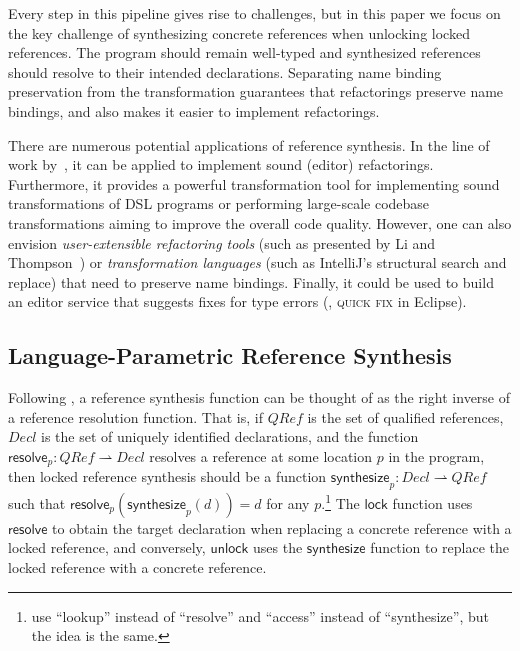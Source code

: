 Every step in this pipeline gives rise to challenges, but in this paper we focus on the key challenge of synthesizing concrete references when unlocking locked references.
The program should remain well-typed and synthesized references should resolve to their intended declarations.
Separating name binding preservation from the transformation guarantees that refactorings preserve name bindings, and also makes it easier to implement refactorings.

There are numerous potential applications of reference synthesis.
In the line of work by~\citet{SchaferEM08,SchaferTST12}, it can be applied to implement sound (editor) refactorings.
Furthermore, it provides a powerful transformation tool for implementing sound transformations of DSL programs or performing large-scale codebase transformations aiming to improve the overall code quality.
However, one can also envision \emph{user-extensible refactoring tools} (such as presented by Li and Thompson~\citep{LiT12-19}) or \emph{transformation languages} (such as IntelliJ's structural search and replace) that need to preserve name bindings.
Finally, it could be used to build an editor service that suggests fixes for type errors (\eg, \textsc{quick fix} in Eclipse).



\subsection{Language-Parametric Reference Synthesis}%
\label{subsec:language-parametric-reference-synthesis}

Following \citet{SchaferEM08,SchaferTST12}, a reference synthesis function can be thought of as the right inverse of a reference resolution function.
That is, if $\mathit{QRef}$ is the set of qualified references, $\mathit{Decl}$ is the set of uniquely identified declarations, and the function $\mathsf{resolve}_p : \mathit{QRef} \rightharpoonup \mathit{Decl}$ resolves a reference at some location $p$ in the program, then locked reference synthesis should be a function $\mathsf{synthesize}_p : \mathit{Decl} \rightharpoonup \mathit{QRef}$ such that $\mathsf{resolve}_p(\mathsf{synthesize}_p(d)) = d$ for any $p$.\footnote{ use ``lookup'' instead of ``resolve'' and ``access'' instead of ``synthesize'', but the idea is the same.}
The $\mathsf{lock}$ function uses $\mathsf{resolve}$ to obtain the target declaration when replacing a concrete reference with a locked reference, and conversely, $\mathsf{unlock}$ uses the $\mathsf{synthesize}$ function to replace the locked reference with a concrete reference.

